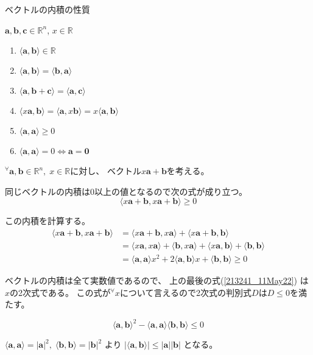 \documentclass[12pt,b5paper]{ltjsarticle}
\begin{document}
ベクトルの内積の性質

$\bm{a}, \bm{b}, \bm{c} \in \mathbb{R}^n$,
$x\in\mathbb{R}$

\begin{enumerate}
 \item $\langle \bm{a}, \bm{b} \rangle \in \mathbb{R}$
 \item $\langle \bm{a}, \bm{b} \rangle = \langle \bm{b}, \bm{a} \rangle$
 \item $\langle \bm{a}, \bm{b}+\bm{c} \rangle = \langle \bm{a}, \bm{c} \rangle$
 \item $\langle x\bm{a}, \bm{b} \rangle = \langle \bm{a}, x\bm{b} \rangle
       = x\langle \bm{a}, \bm{b} \rangle$
 \item $\langle \bm{a}, \bm{a} \rangle \geq 0$
 \item $\langle \bm{a}, \bm{a} \rangle = 0 \Leftrightarrow \bm{a}=\bm{0}$
\end{enumerate}

\dotfill

${}^\forall \bm{a}, \bm{b}\in \mathbb{R}^n, \; x\in\mathbb{R}$に対し、
ベクトル$x\bm{a}+\bm{b}$を考える。

同じベクトルの内積は0以上の値となるので次の式が成り立つ。
\begin{equation}
 \langle x\bm{a} + \bm{b}, x\bm{a} + \bm{b} \rangle \geq 0
\end{equation}

この内積を計算する。
\begin{align}
 \langle x\bm{a} + \bm{b},  x\bm{a} + \bm{b} \rangle
 &= \langle x\bm{a} + \bm{b}, x\bm{a} \rangle + \langle x\bm{a} + \bm{b}, \bm{b} \rangle\\
 &= \langle x\bm{a}, x\bm{a} \rangle + \langle \bm{b}, x\bm{a} \rangle
 + \langle x\bm{a}, \bm{b} \rangle + \langle \bm{b}, \bm{b} \rangle\\
 &= \langle \bm{a}, \bm{a} \rangle x^2 + 2 \langle \bm{a}, \bm{b} \rangle x
+ \langle \bm{b}, \bm{b} \rangle \geq 0\label{213241_11May22}
\end{align}

ベクトルの内積は全て実数値であるので、
上の最後の式(\ref{213241_11May22}) は$x$の2次式である。
この式が${}^\forall x$について言えるので2次式の判別式$D$は$D\leq 0$を満たす。

\begin{equation}
\langle \bm{a}, \bm{b} \rangle^2 -
\langle \bm{a}, \bm{a} \rangle \langle \bm{b}, \bm{b} \rangle \leq 0
\end{equation}

$\langle \bm{a}, \bm{a} \rangle = \lvert \bm{a} \rvert^2,
\; \langle \bm{b}, \bm{b} \rangle = \lvert \bm{b} \rvert^2$
より
$\lvert \langle \bm{a}, \bm{b} \rangle \rvert
  \leq
 \lvert \bm{a} \rvert \lvert \bm{b} \rvert
$
となる。
\end{document}
